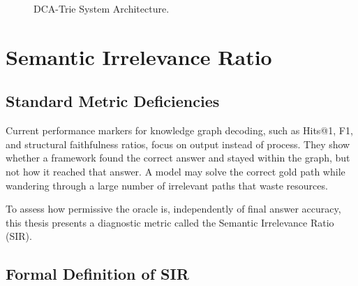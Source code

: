 \begin{figure}
{
  }%
  \caption[DCA-Trie System Architecture]{DCA-Trie System Architecture.}
  \label{fig:architecture}
\end{figure}


\section{Semantic Irrelevance Ratio}
\label{sec:ch3sir}

\subsection{Standard Metric Deficiencies}

Current performance markers for knowledge graph decoding, such as Hits@1, F1, and structural faithfulness ratios, focus on output instead of process. They show whether a framework found the correct answer and stayed within the graph, but not how it reached that answer. A model may solve the correct gold path while wandering through a large number of irrelevant paths that waste resources.

To assess how permissive the oracle is, independently of final answer accuracy, this thesis presents a diagnostic metric called the Semantic Irrelevance Ratio (SIR).

\subsection{Formal Definition of SIR}

